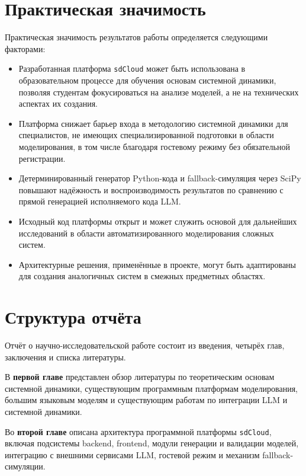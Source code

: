\section*{Практическая значимость}

Практическая значимость результатов работы определяется следующими факторами:

\begin{itemize}
    \item Разработанная платформа \texttt{sdCloud} может быть использована в образовательном процессе для обучения основам системной динамики, позволяя студентам фокусироваться на анализе моделей, а не на технических аспектах их создания.

    \item Платформа снижает барьер входа в методологию системной динамики для специалистов, не имеющих специализированной подготовки в области моделирования, в том числе благодаря гостевому режиму без обязательной регистрации.

    \item Детерминированный генератор Python-кода и fallback-симуляция через SciPy повышают надёжность и воспроизводимость результатов по сравнению с прямой генерацией исполняемого кода LLM.

    \item Исходный код платформы открыт и может служить основой для дальнейших исследований в области автоматизированного моделирования сложных систем.

    \item Архитектурные решения, применённые в проекте, могут быть адаптированы для создания аналогичных систем в смежных предметных областях.
\end{itemize}

\section*{Структура отчёта}

Отчёт о научно-исследовательской работе состоит из введения, четырёх глав, заключения и списка литературы.

В \textbf{первой главе} представлен обзор литературы по теоретическим основам системной динамики, существующим программным платформам моделирования, большим языковым моделям и существующим работам по интеграции LLM и системной динамики.

Во \textbf{второй главе} описана архитектура программной платформы \texttt{sdCloud}, включая подсистемы backend, frontend, модули генерации и валидации моделей, интеграцию с внешними сервисами LLM, гостевой режим и механизм fallback-симуляции.

